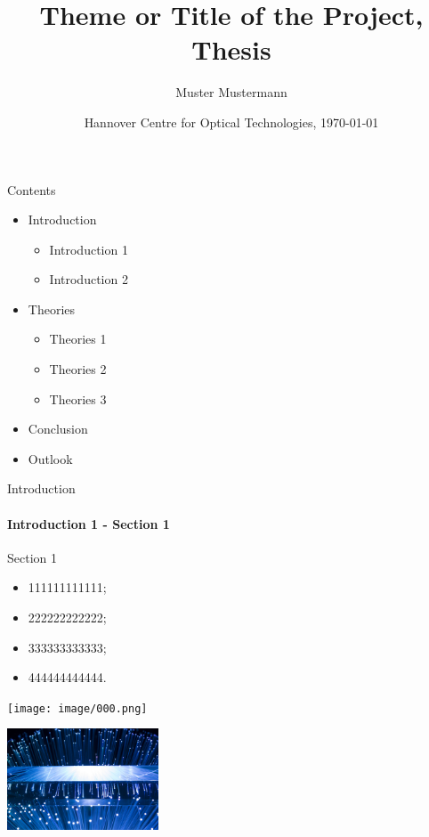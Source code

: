 \documentclass[t]{beamer}
\title{Theme or Title of the Project, Thesis}
\date[\today]{Hannover Centre for Optical Technologies, \today}
\author[Mustermann]{Muster Mustermann}
\institute[HOT]{Hannover Centre for Optical Technologies}
\begin{document}
\begin{frame}
\label{P1 Titlepage}
\titlepage
\end{frame}


\begin{frame}{Contents}
\label{P2 Content}

\begin{itemize}
  \item Introduction
    \begin{itemize}
        \item Introduction 1
	    \item Introduction 2
    \end{itemize}
    \item Theories
    \begin{itemize}
        \item Theories 1
	    \item Theories 2
	    \item Theories 3
    \end{itemize}
    \item Conclusion
    \item Outlook
\end{itemize}

\end{frame}


\begin{frame}{Introduction}
\framesubtitle{Introduction 1 - Section 1}
\label{P3 Introduction}

Section 1
\begin{itemize}
\item 111111111111;
\item 222222222222;
\item 333333333333;
\item 444444444444.
\end{itemize} 

\begin{minipage}[t]{.45\textwidth}
\centering
\texttt{[image: image/000.png]}
\end{minipage}
\begin{minipage}[t]{.45\textwidth}
\centering
\includegraphics[width = 45mm]{image/a}
\end{minipage}

\end{frame}
\end{document}
